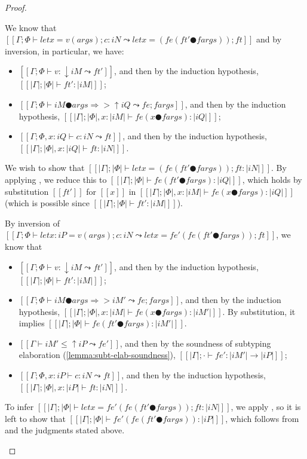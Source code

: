 \begin{proof}
\begin{caseof}
    \item {}
      We know that
      $[[Γ ; Φ ⊢ let x = v(args); c : iN ⤳ let x = (fe (ft' ● fargs)) ; ft]]$
      and by inversion, in particular, we have:
      \begin{itemize}
        \item $[[Γ ; Φ ⊢ v : ↓iM ⤳ ft']]$, and then by the induction hypothesis,
          $[[|Γ| ; |Φ| ⊢ ft' : |iM|]]$;
        \item $[[Γ; Φ ⊢ iM ● args ⇒> ↑iQ ⤳ fe ; fargs]]$, and then by the induction hypothesis,
          $[[|Γ| ; |Φ|, x:|iM| ⊢ fe (x ● fargs) : |iQ|]]$;
        \item $[[Γ; Φ, x:iQ ⊢ c : iN ⤳ ft]]$, and then by the induction hypothesis,
          $[[|Γ| ; |Φ|, x:|iQ| ⊢ ft : |iN|]]$.
      \end{itemize}
      We wish to show that 
      $[[|Γ| ; |Φ| ⊢ let x = (fe (ft' ● fargs)) ; ft : |iN|]]$.
      By applying ,
      we reduce this to
      $[[|Γ| ; |Φ| ⊢ fe (ft' ● fargs) : |iQ|]]$,
      which holds by substitution $[[ft']]$ for $[[x]]$ in
      $[[|Γ| ; |Φ|, x:|iM| ⊢ fe (x ● fargs) : |iQ|]]$
      (which is possible since $[[|Γ| ; |Φ| ⊢ ft' : |iM|]]$).
    \item {}
      By inversion of 
      $[[Γ ; Φ ⊢ let x:iP = v(args); c : iN ⤳ let x = fe' (fe (ft' ● fargs)); ft]]$, 
      we know that
      \begin{itemize}
        \item $[[Γ ; Φ ⊢ v : ↓iM ⤳ ft']]$, and then by the induction hypothesis,
          $[[|Γ| ; |Φ| ⊢ ft' : |iM|]]$;
        \item $[[Γ; Φ ⊢ iM ● args ⇒> iM' ⤳ fe ; fargs]]$, and then by the induction hypothesis,
          $[[|Γ| ; |Φ|, x:|iM| ⊢ fe (x ● fargs) : |iM'|]]$. 
          By substitution, it implies $[[|Γ| ; |Φ|⊢ fe (ft' ● fargs) : |iM'|]]$. 
        \item $[[Γ ⊢ iM' ≤ ↑iP ⤳ fe']]$, and then by the soundness of 
          subtyping elaboration (\cref{lemma:subt-elab-soundness}),
          $[[|Γ| ; · ⊢ fe' : |iM'| → |iP|]]$;
        \item $[[Γ; Φ, x:iP ⊢ c : iN ⤳ ft]]$, and then by the induction hypothesis,
          $[[|Γ| ; |Φ|, x:|iP| ⊢ ft : |iN|]]$.
      \end{itemize}

      To infer $[[|Γ| ; |Φ| ⊢ let x = fe' (fe (ft' ● fargs)) ; ft : |iN|]]$,
      we apply ,
      so it is left to show that $[[|Γ| ; |Φ| ⊢ fe' (fe (ft' ● fargs)) : |iP|]]$, 
      which follows from  and the judgments stated above.


\end{caseof}
\end{proof}
